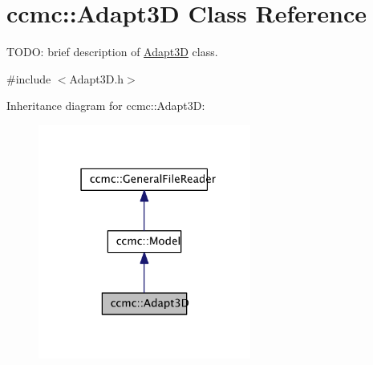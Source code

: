 \hypertarget{classccmc_1_1_adapt3_d}{\section{ccmc\-:\-:Adapt3\-D Class Reference}
\label{classccmc_1_1_adapt3_d}
}


T\-O\-D\-O\-: brief description of \hyperlink{classccmc_1_1_adapt3_d}{Adapt3\-D} class.  




{\ttfamily \#include $<$Adapt3\-D.\-h$>$}



Inheritance diagram for ccmc\-:\-:Adapt3\-D\-:\nopagebreak
\begin{figure}[H]
\begin{center}
\leavevmode
\includegraphics[width=198pt]{classccmc_1_1_adapt3_d__inherit__graph}
\end{center}
\end{figure}


